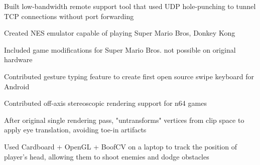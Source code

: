 \documentclass[12pt]{jmichaud-resume}
\begin{document}
 \hfill {}
\begin{tightemize}
	\item Built low-bandwidth remote support tool that used UDP hole-punching to tunnel TCP connections without port forwarding
\end{tightemize}
\sectionsep

 \hfill {}

\begin{minipage}[t]{0.49\textwidth} 

 \hfill
{}
\begin{tightemize}
	\item Created NES emulator capable of playing Super Mario Bros, Donkey Kong
	\item Included game modifications for Super Mario Bros. not possible on original hardware
\end{tightemize}
\sectionsep

\end{minipage} 
\hfill
\begin{minipage}[t]{0.49\textwidth}

 \hfill
{}
\begin{tightemize}
	\item Contributed gesture typing feature to create first open source swipe keyboard for Android
\end{tightemize}
\sectionsep

\end{minipage} 
\hfill
\begin{minipage}[t]{0.49\textwidth}

 \hfill
{}
\begin{tightemize}
	\item Contributed off-axis stereoscopic rendering support for n64 games
	\item After original single rendering pass, "untransforms" vertices from clip space to apply eye translation, avoiding toe-in artifacts 
\end{tightemize}
\sectionsep

\end{minipage} 
\hfill
\begin{minipage}[t]{0.49\textwidth}

 \hfill
{}
\begin{tightemize}
	\item Used Cardboard + OpenGL + BoofCV on a laptop to track the position of player’s head, allowing them to shoot enemies and dodge obstacles
\end{tightemize}
\sectionsep
\end{minipage}
\end{document}
